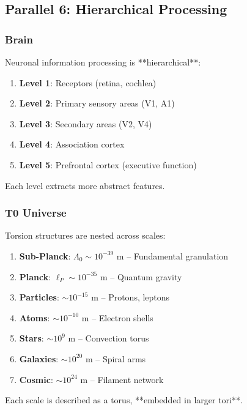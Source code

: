 	\subsection{Parallel 6: Hierarchical Processing}

	\subsubsection{Brain}

	Neuronal information processing is **hierarchical**:

	\begin{enumerate}
		\item \textbf{Level 1}: Receptors (retina, cochlea)
		\item \textbf{Level 2}: Primary sensory areas (V1, A1)
		\item \textbf{Level 3}: Secondary areas (V2, V4)
		\item \textbf{Level 4}: Association cortex
		\item \textbf{Level 5}: Prefrontal cortex (executive function)
	\end{enumerate}

	Each level extracts more abstract features.

	\subsubsection{T0 Universe}

	Torsion structures are nested across scales:

	\begin{enumerate}
		\item \textbf{Sub-Planck}: $\Lambda_0 \sim 10^{-39}$ m -- Fundamental granulation
		\item \textbf{Planck}: $\ell_P \sim 10^{-35}$ m -- Quantum gravity
		\item \textbf{Particles}: $\sim 10^{-15}$ m -- Protons, leptons
		\item \textbf{Atoms}: $\sim 10^{-10}$ m -- Electron shells
		\item \textbf{Stars}: $\sim 10^9$ m -- Convection torus
		\item \textbf{Galaxies}: $\sim 10^{20}$ m -- Spiral arms
		\item \textbf{Cosmic}: $\sim 10^{24}$ m -- Filament network
	\end{enumerate}

	Each scale is described as a torus, **embedded in larger tori**.

